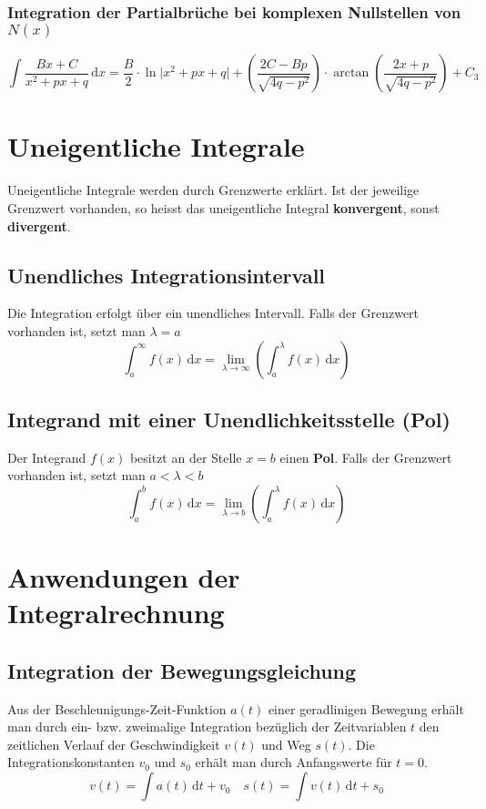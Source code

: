 \subsubsection{Integration der Partialbrüche bei komplexen Nullstellen von $N\left(x\right)$}
\begin{equation}
\boxed{\displaystyle \int \dfrac{Bx+C}{x^2+px+q}\,\text{d}x=\dfrac{B}{2}\cdot \ln\Big\vert x^2+px+q\Big\vert+\left(\dfrac{2C-Bp}{\sqrt{4q-p^2}}\right)\cdot \arctan\left(\dfrac{2x+p}{\sqrt{4q-p^2}}\right)+C_3}
\end{equation}
\section{Uneigentliche Integrale}
Uneigentliche Integrale werden durch Grenzwerte erklärt. Ist der jeweilige Grenzwert vorhanden, so heisst das uneigentliche Integral \textbf{konvergent}, sonst \textbf{divergent}.
\subsection{Unendliches Integrationsintervall}
Die Integration erfolgt über ein unendliches Intervall. Falls der Grenzwert vorhanden ist, setzt man $\lambda=a$
\begin{equation}
\boxed{\displaystyle \int_{a}^{\infty}f\left(x\right)\,\text{d}x=\displaystyle \lim_{\lambda\rightarrow \infty}\left(\displaystyle \int_a^{\lambda}f\left(x\right)\,\text{d}x\right)}
\end{equation}
\subsection{Integrand mit einer Unendlichkeitsstelle (Pol)}
Der Integrand $f\left(x\right)$ besitzt an der Stelle $x=b$ einen \textbf{Pol}. Falls der Grenzwert vorhanden ist, setzt man $a<\lambda < b$
\begin{equation} 
\boxed{\displaystyle \int_a^bf\left(x\right)\,\text{d}x=\displaystyle \lim_{\lambda\rightarrow b}\left(\displaystyle \int_a^{\lambda}f\left(x\right)\,\text{d}x\right)}
\end{equation} 
\section{Anwendungen der Integralrechnung}
\subsection{Integration der Bewegungsgleichung}
Aus der Beschleunigungs-Zeit-Funktion $a\left(t\right)$ einer geradlinigen Bewegung erhält man durch ein- bzw. zweimalige Integration bezüglich der Zeitvariablen $t$ den zeitlichen Verlauf der Geschwindigkeit $v\left(t\right)$ und Weg $s\left(t\right)$. Die Integrationskonstanten $v_0$ und $s_0$ erhält man durch Anfangswerte für $t=0$.
\begin{equation}
\boxed{v\left(t\right)=\displaystyle \int a\left(t\right)\,\text{d}t+v_0}\quad \boxed{s\left(t\right)=\displaystyle \int v\left(t\right)\,\text{d}t+s_0}
\end{equation}
